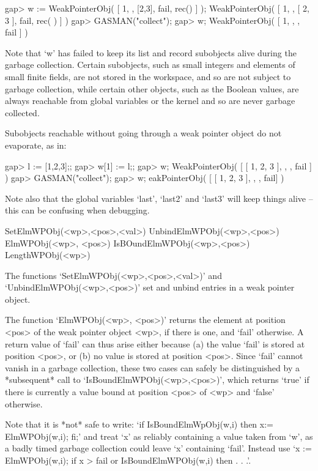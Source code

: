 \begintt
gap> w := WeakPointerObj( [ 1, , [2,3], fail, rec() ] );
WeakPointerObj( [ 1, , [ 2, 3 ], fail, rec( ) ] )
gap> GASMAN("collect");
gap> w;
WeakPointerObj( [ 1, , , fail ] )
\endtt

Note that `w' has failed to keep its  list and record subobjects alive during
the garbage    collection.  Certain subobjects, such  as   small integers and
elements of small finite fields, are not stored in  the workspace, and so are
not subject  to garbage collection, while certain  other objects, such as the
Boolean values, are always reachable from  global variables or the kernel and
so are never garbage collected.

Subobjects reachable without  going  through  a weak  pointer object  do  not
evaporate, as in:

\begintt
gap> l := [1,2,3];;
gap> w[1] := l;;
gap> w;
WeakPointerObj( [ [ 1, 2, 3 ], , , fail ] )
gap> GASMAN("collect");
gap> w;                
eakPointerObj( [ [ 1, 2, 3 ], , , fail] )
\endtt

Note also  that the global  variables  `last', `last2' and `last3'  will keep
things alive -- this can be confusing when debugging.


\>SetElmWPObj(<wp>,<pos>,<val>)
\>UnbindElmWPObj(<wp>,<pos>)
\>ElmWPObj(<wp>, <pos>)
\>IsBOundElmWPObj(<wp>,<pos>)
\>LengthWPObj(<wp>)

The          functions           `SetElmWPObj(<wp>,<pos>,<val>)'          and
`UnbindElmWPObj(<wp>,<pos>)' set and unbind entries in a weak pointer object.

The function `ElmWPObj(<wp>, <pos>)' returns the element at position <pos> of
the weak pointer object <wp>, if there is one, and `fail' otherwise. A return
value of `fail' can thus arise either because (a)  the value `fail' is stored
at position <pos>, or (b) no value is stored  at position <pos>. Since `fail'
cannot   vanish in  a  garbage collection,   these   two cases can  safely be
distinguished by  a *subsequent* call to `IsBoundElmWPObj(<wp>,<pos>)', which
returns `true' if there is currently a value bound at  position <pos> of <wp>
and `false' otherwise.

Note that it  is  *not*  safe to write:   `if IsBoundElmWpObj(w,i)  then  x:=
ElmWPObj(w,i); fi;'  and treat `x' as  reliably containing a value taken from
`w', as a badly  timed garbage collection could  leave `x' containing `fail'. 
Instead use `x := ElmWPObj(w,i); if x \<> fail or IsBoundElmWPObj(w,i) then . 
. .'.

